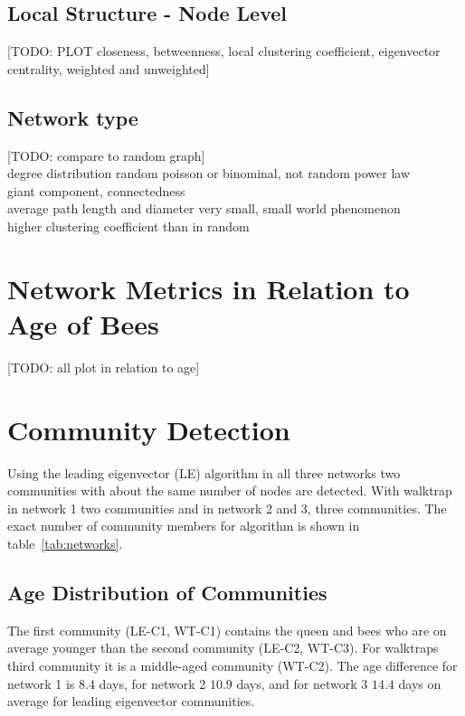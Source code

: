 \subsection{Local Structure - Node Level}

[TODO: PLOT closeness, betweenness, local clustering coefficient, eigenvector centrality, weighted and unweighted]

\subsection{Network type}

[TODO: compare to random graph]\\
degree distribution random poisson or binominal, not random power law\\
giant component, connectedness\\
average path length and diameter very small, small world phenomenon\\
higher clustering coefficient than in random\\

\section{Network Metrics in Relation to Age of Bees}

[TODO: all plot in relation to age]

\section{Community Detection}

Using the leading eigenvector (LE) algorithm in all three networks two communities with about the same number of nodes are detected. With walktrap in network 1 two communities and in network 2 and 3, three communities. The exact number of community members for algorithm is shown in table~\ref{tab:networks}.

\subsection{Age Distribution of Communities}
The first community (LE-C1, WT-C1) contains the queen and bees who are on average younger than the second community (LE-C2, WT-C3). For walktraps third community it is a middle-aged community (WT-C2). The age difference for network 1 is $8.4$ days, for network 2 $10.9$ days, and for network 3 $14.4$ days on average for leading eigenvector communities.

